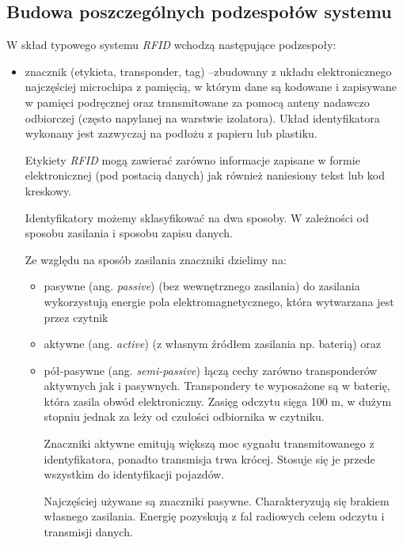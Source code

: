 \subsection{Budowa poszczególnych podzespołów systemu}

W skład typowego systemu \emph{RFID} wchodzą następujące podzespoły:

\begin{itemize}\setlength{\itemsep}{0pt}
	\item znacznik  (etykieta, transponder, tag) –zbudowany z układu elektronicznego najczęściej microchipa z pamięcią, w którym dane są  kodowane i zapisywane w pamięci podręcznej oraz transmitowane za pomocą anteny nadawczo odbiorczej (często napylanej na warstwie izolatora). Układ identyfikatora wykonany jest zazwyczaj na podłożu z papieru lub plastiku. 

	Etykiety \emph{RFID} mogą zawierać zarówno informacje zapisane w formie elektronicznej (pod postacią danych) jak również naniesiony tekst lub kod kreskowy. 

	Identyfikatory możemy sklasyfikować na dwa sposoby. W zależności od sposobu zasilania i sposobu zapisu danych. 

	Ze względu na sposób zasilania znaczniki dzielimy na: 

	\begin{itemize}\setlength{\itemsep}{0pt}

	\item pasywne  (ang. \emph{passive}) (bez wewnętrznego zasilania) do zasilania  wykorzystują energie pola elektromagnetycznego, która wytwarzana jest przez czytnik
	
	\item aktywne (ang. \emph{active}) (z własnym źródłem zasilania np. baterią) oraz 

	\item pół-pasywne (ang. \emph{semi-passive}) łączą cechy zarówno transponderów aktywnych jak i pasywnych. Transpondery te wyposażone są w baterię, która zasila obwód elektroniczny. Zasięg odczytu sięga 100 m, w dużym stopniu jednak za leży od czułości odbiornika w czytniku.  

	Znaczniki aktywne emitują większą moc sygnału transmitowanego z identyfikatora, ponadto transmisja trwa krócej. Stosuje się je przede wszystkim do identyfikacji pojazdów.

	Najczęściej używane są znaczniki pasywne. Charakteryzują się brakiem własnego zasilania. Energię pozyskują z fal radiowych celem odczytu i transmisji danych.  
	

\end{itemize}
\end{itemize}
